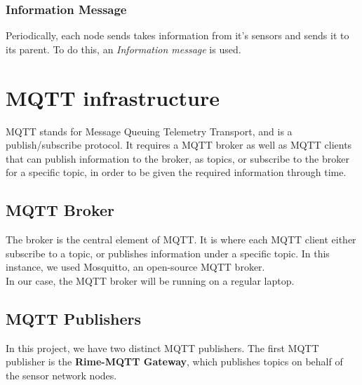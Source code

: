\documentclass[a4paper,11pt]{article}
\begin{document}
\subsubsection{Information Message}
Periodically, each node sends takes information from it's sensors and sends it to its parent. To do this, an \textit{Information message} is used.

\section{MQTT infrastructure}
MQTT stands for Message Queuing Telemetry Transport, and is a publish/subscribe protocol. It requires a MQTT broker as well as MQTT clients that can publish information to the broker, as topics, or subscribe to the broker for a specific topic, in order to be given the required information through time.

\subsection{MQTT Broker}
The broker is the central element of MQTT. It is where each MQTT client either subscribe to a topic, or publishes information under a specific topic. In this instance, we used Mosquitto, an open-source MQTT broker.\\

In our case, the MQTT broker will be running on a regular laptop.


\subsection{MQTT Publishers}
In this project, we have two distinct MQTT publishers. The first MQTT publisher is the \textbf{Rime-MQTT Gateway}, which publishes topics on behalf of the sensor network nodes.\\
\end{document}
